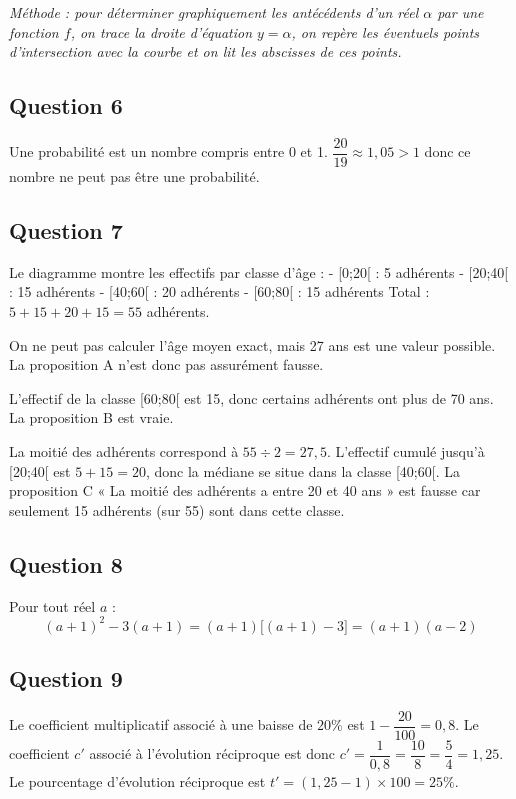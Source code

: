 \documentclass[a4paper,12pt]{article}
\begin{document}

\emph{Méthode : pour déterminer graphiquement les antécédents d'un réel $\alpha$ par une fonction $f$, on trace la droite d'équation $y = \alpha$, on repère les éventuels points d'intersection avec la courbe et on lit les abscisses de ces points.}

\subsection*{Question 6}
Une probabilité est un nombre compris entre 0 et 1. $\dfrac{20}{19} \approx 1,05 > 1$ donc ce nombre ne peut pas être une probabilité.


\subsection*{Question 7}
Le diagramme montre les effectifs par classe d'âge :
- [0;20[ : 5 adhérents
- [20;40[ : 15 adhérents
- [40;60[ : 20 adhérents
- [60;80[ : 15 adhérents
Total : $5 + 15 + 20 + 15 = 55$ adhérents.

On ne peut pas calculer l'âge moyen exact, mais 27 ans est une valeur possible. La proposition A n'est donc pas assurément fausse.

L'effectif de la classe [60;80[ est 15, donc certains adhérents ont plus de 70 ans. La proposition B est vraie.

La moitié des adhérents correspond à $55 \div 2 = 27,5$. L'effectif cumulé jusqu'à [20;40[ est $5 + 15 = 20$, donc la médiane se situe dans la classe [40;60[. La proposition C « La moitié des adhérents a entre 20 et 40 ans » est fausse car seulement 15 adhérents (sur 55) sont dans cette classe.


\subsection*{Question 8}
Pour tout réel $a$ :
\[
(a+1)^2 - 3(a+1) = (a+1)\big[(a+1) - 3\big] = (a+1)(a-2)
\]


\subsection*{Question 9}
Le coefficient multiplicatif associé à une baisse de $20\%$ est $1 - \dfrac{20}{100} = 0,8$.
Le coefficient $c'$ associé à l'évolution réciproque est donc $c' = \dfrac{1}{0,8} = \dfrac{10}{8} = \dfrac{5}{4} = 1,25$.
Le pourcentage d'évolution réciproque est $t' = (1,25 - 1) \times 100 = 25\%$.
\end{document}
